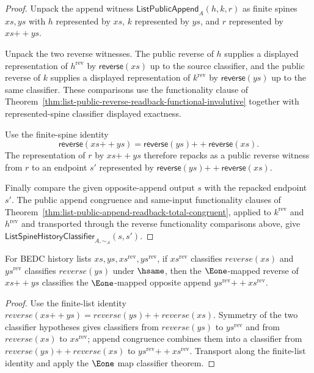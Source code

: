 \begin{proof}
Unpack the append witness $\mathsf{ListPublicAppend}_A(h,k,r)$ as finite spines
$xs,ys$ with $h$ represented by $xs$, $k$ represented by $ys$, and $r$
represented by $xs{++}ys$.

Unpack the two reverse witnesses. The public reverse of $h$ supplies a
displayed representation of $h^{\mathrm{rev}}$ by $\mathsf{reverse}(xs)$ up to
the source classifier, and the public reverse of $k$ supplies a displayed
representation of $k^{\mathrm{rev}}$ by $\mathsf{reverse}(ys)$ up to the same
classifier. These comparisons use the functionality clause of
Theorem~\ref{thm:list-public-reverse-readback-functional-involutive} together
with represented-spine classifier displayed exactness.

Use the finite-spine identity
$$
\mathsf{reverse}(xs{++}ys)=\mathsf{reverse}(ys){++}\mathsf{reverse}(xs).
$$
The representation of $r$ by $xs{++}ys$ therefore repacks as a public reverse
witness from $r$ to an endpoint $s'$ represented by
$\mathsf{reverse}(ys){++}\mathsf{reverse}(xs)$.

Finally compare the given opposite-append output $s$ with the repacked endpoint
$s'$. The public append congruence and same-input functionality clauses of
Theorem~\ref{thm:list-public-append-readback-total-congruent}, applied to
$k^{\mathrm{rev}}$ and $h^{\mathrm{rev}}$ and transported through the reverse
functionality comparisons above, give
$\mathsf{ListSpineHistoryClassifier}_{A,\sim_A}(s,s')$.
\end{proof}

\begin{theorem}
\label{thm:list-classifier-map-e1-reverse-append-antimorphism}
For BEDC history lists $xs,ys,xs^{\mathrm{rev}},ys^{\mathrm{rev}}$, if
$xs^{\mathrm{rev}}$ classifies $reverse(xs)$ and $ys^{\mathrm{rev}}$
classifies $reverse(ys)$ under $\hsame$, then the $\Eone$-mapped reverse of
$xs{++}ys$ classifies the $\Eone$-mapped opposite append
$ys^{\mathrm{rev}}{++}xs^{\mathrm{rev}}$.
\end{theorem}
\begin{proof}
Use the finite-list identity
$reverse(xs{++}ys)=reverse(ys){++}reverse(xs)$. Symmetry of the two classifier
hypotheses gives classifiers from $reverse(ys)$ to $ys^{\mathrm{rev}}$ and
from $reverse(xs)$ to $xs^{\mathrm{rev}}$; append congruence combines them into
a classifier from $reverse(ys){++}reverse(xs)$ to
$ys^{\mathrm{rev}}{++}xs^{\mathrm{rev}}$. Transport along the finite-list
identity and apply the $\Eone$ map classifier theorem.
\end{proof}

